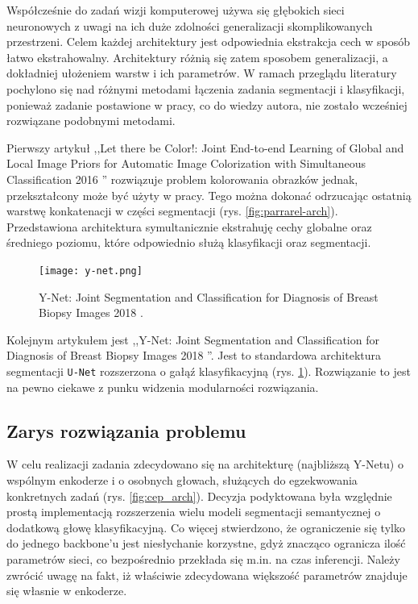 Współcześnie do zadań wizji komputerowej używa się głębokich sieci neuronowych z uwagi na ich duże zdolności generalizacji skomplikowanych przestrzeni. Celem każdej architektury jest odpowiednia ekstrakcja cech w sposób łatwo ekstrahowalny. Architektury różnią się zatem sposobem generalizacji, a dokładniej ułożeniem warstw i ich parametrów. W ramach przeglądu literatury pochylono się nad różnymi metodami łączenia zadania segmentacji i klasyfikacji, ponieważ zadanie postawione w pracy, co do wiedzy autora, nie zostało wcześniej rozwiązane podobnymi metodami.

Pierwszy artykuł ,,Let there be Color!: Joint End-to-end Learning of Global and Local Image Priors for Automatic Image Colorization with Simultaneous Classification 2016 \cite{iizuka2016let}'' rozwiązuje problem kolorowania obrazków jednak, przekształcony może być użyty w pracy. Tego można dokonać odrzucając ostatnią warstwę konkatenacji w części segmentacji (rys. \ref{fig:parrarel-arch}). Przedstawiona architektura symultanicznie ekstrahuję cechy globalne oraz średniego poziomu, które odpowiednio służą klasyfikacji oraz segmentacji.

\begin{figure}[ht!]
    \texttt{[image: y-net.png]}
    \caption{Y-Net: Joint Segmentation and Classification for Diagnosis of Breast Biopsy Images 2018 \cite{mehta2018net}.}
    \label{fig:y-net}
\end{figure}

Kolejnym artykułem jest ,,Y-Net: Joint Segmentation and Classification for Diagnosis of Breast Biopsy Images 2018 \cite{mehta2018net}''. Jest to standardowa architektura segmentacji \texttt{U-Net} rozszerzona o gałąź klasyfikacyjną (rys. \ref{fig:y-net}). Rozwiązanie to jest na pewno ciekawe z punku widzenia modularności rozwiązania.

\subsection{Zarys rozwiązania problemu}
W celu realizacji zadania zdecydowano się na architekturę (najbliższą Y-Netu) o wspólnym enkoderze i o osobnych głowach, służących do egzekwowania konkretnych zadań (rys. \ref{fig:cep_arch}). Decyzja podyktowana była względnie prostą implementacją rozszerzenia wielu modeli segmentacji semantycznej o dodatkową głowę klasyfikacyjną. Co więcej stwierdzono, że ograniczenie się tylko do jednego backbone'u jest niesłychanie korzystne, gdyż znacząco ogranicza ilość parametrów sieci, co bezpośrednio przekłada się m.in. na czas inferencji. Należy zwrócić uwagę na fakt, iż właściwie zdecydowana większość parametrów znajduje się własnie w enkoderze.

